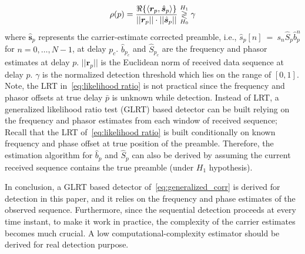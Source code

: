 \begin{equation}
    \label{eq:generalized_corr}
    \rho(p)=
    \frac{\Re\{\langle
      \bm{r}_{p},\hat{\bm{s}}_{p}\rangle\}}
    {||\bm{r}_{p}||\cdot||\hat{\bm{s}}_{p}||} \mathrel{\mathop\gtrless\limits^{H_1}_{H_0}} \gamma
  \end{equation}
where $\hat{\bm{s}}_{p}$ represents the carrier-estimate corrected preamble, i.e., $\hat{s}_{p}[n]~{=}~s_{n}\hat{S}_{p}\hat{b}_{p}^n$ for $n=0,\ldots,N{-}1$,
at delay $p_c$. $\hat{b}_{p_c}$ and $\hat{S}_{p_c}$ are the frequency and phasor estimates at delay $p$.
$||\bm{r}_{p}||$ is the Euclidean norm of received data sequence at delay $p$.
$\gamma$ is the normalized detection threshold which lies on the range of $[0,1]$.
Note, the LRT in~\eqref{eq:likelihood ratio} is not practical since the frequency and phasor offsets at true delay $\bar{p}$
is unknown while detection. Instead of LRT, a generalized likelihood ratio test (GLRT) based detector can be built relying on the frequency and phasor estimates from each window of received sequence;
Recall that the LRT of~\eqref{eq:likelihood ratio} is built conditionally on known frequency and phase offset 
at true position of the preamble.
Therefore, the estimation algorithm for $\hat{b}_{p}$ and $\hat{S}_{p}$ can also be derived by
assuming the current received sequence contains the true preamble (under $H_1$ hypothesis).

In conclusion, a GLRT based detector of~\eqref{eq:generalized_corr} is derived for detection in this paper, and it relies on the frequency and phase estimates of the observed sequence.
Furthermore, since the sequential detection proceeds at every time instant, to make it work in practice, the complexity of the carrier estimates becomes
much crucial. A low computational-complexity estimator should be derived for real detection purpose.








